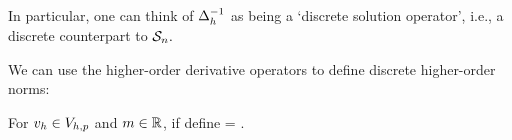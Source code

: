 \ede
In particular, one can think of $\Delta_{h}^{-1}$ as being a `discrete solution operator', i.e., a discrete counterpart to $\mathcal S_{n}.$






We can use the higher-order derivative operators to define discrete higher-order norms:

For $v_{h} \in V_{h,p}$ and $m \in \mathbb R$, if define
\beqs
\Nshn{\vh} = .
\eeqs
\ede




